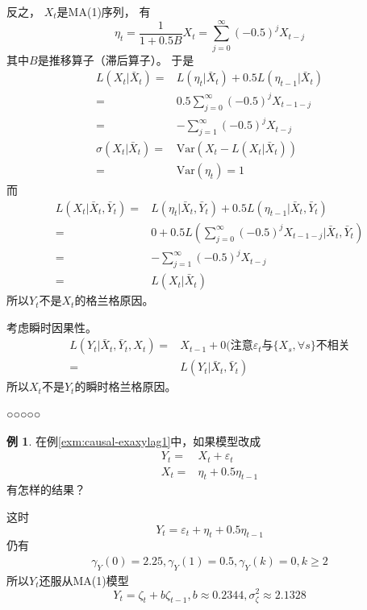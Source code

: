 \documentclass[
]{book}
\theoremstyle{definition}
\theoremstyle{definition}
\newtheorem{example}{例}[chapter]
\theoremstyle{definition}
\theoremstyle{definition}
\theoremstyle{remark}
\begin{document}
反之，
\(X_t\)是MA(1)序列，
有
\[
\eta_t = \frac{1}{1 + 0.5 B} X_t
= \sum_{j=0}^\infty (-0.5)^j X_{t-j}
\]
其中\(B\)是推移算子（滞后算子）。
于是
\[\begin{aligned}
L(X_t | \bar X_t)
=& L(\eta_t | \bar X_t)
+ 0.5 L(\eta_{t-1} | \bar X_t) \\
=& 0.5 \sum_{j=0}^\infty (-0.5)^j X_{t-1-j} \\
=& - \sum_{j=1}^\infty (-0.5)^j X_{t-j} \\
\sigma(X_t | \bar X_t)
=& \text{Var}(X_t - L(X_t | \bar X_t)) \\
=& \text{Var}(\eta_t) = 1
\end{aligned}\]
而
\[\begin{aligned}
L(X_t | \bar X_t, \bar Y_t) 
=& L(\eta_t | \bar X_t, \bar Y_t)
+ 0.5 L(\eta_{t-1} | \bar X_t, \bar Y_t) \\
=& 0 +
0.5 L(\sum_{j=0}^\infty (-0.5)^j X_{t-1-j} | \bar X_t, \bar Y_t) \\
=& -\sum_{j=1}^\infty (-0.5)^j X_{t-j} \\
=& L(X_t | \bar X_t)
\end{aligned}\]
所以\(Y_t\)不是\(X_t\)的格兰格原因。

考虑瞬时因果性。
\[\begin{aligned}
L(Y_t | \bar X_t, \bar Y_t, X_t)
=& X_{t-1} + 0 (\text{注意}\varepsilon_t\text{与}\{X_s, \forall s\}\text{不相关} \\
=& L(Y_t | \bar X_t, \bar Y_t)
\end{aligned}\]
所以\(X_t\)不是\(Y_t\)的瞬时格兰格原因。

○○○○○

\begin{example}
\protect\hypertarget{exm:causal-exaxylag2}{}{\label{exm:causal-exaxylag2} }在例\ref{exm:causal-exaxylag1}中，如果模型改成
\[\begin{aligned}
Y_t =& X_{t} + \varepsilon_t \\
X_t =& \eta_t + 0.5 \eta_{t-1}
\end{aligned}\]
有怎样的结果？
\end{example}

这时
\[
Y_t = \varepsilon_t + \eta_t + 0.5 \eta_{t-1}
\]
仍有
\[\begin{aligned}
\gamma_Y(0) = 2.25,
\gamma_Y(1) = 0.5,
\gamma_Y(k) = 0, k \geq 2
\end{aligned}\]
所以\(Y_t\)还服从MA(1)模型
\[
Y_t = \zeta_t + b \zeta_{t-1},
b \approx 0.2344,
\sigma^2_\zeta \approx 2.1328
\]
\end{document}
